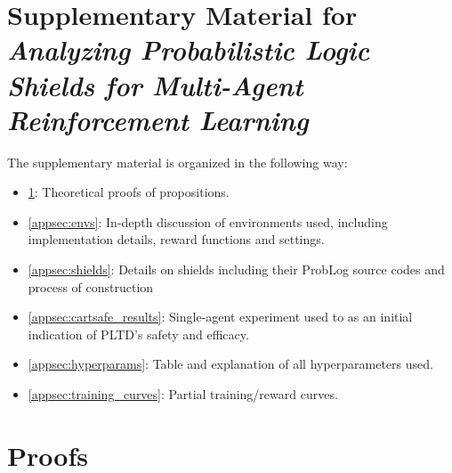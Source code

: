 \documentclass{ecai}
\theoremstyle{plain}
\theoremstyle{definition}
\theoremstyle{remark}
\begin{document}





\appendix


\section*{Supplementary Material for \textit{Analyzing Probabilistic Logic Shields for Multi-Agent Reinforcement Learning}}
The supplementary material is organized in the following way:
\begin{itemize} [Appendix]
    \item \ref{appsec:proofs}: Theoretical proofs of propositions.
    \item \ref{appsec:envs}: In-depth discussion of environments used, including implementation details, reward functions and settings. 
    \item \ref{appsec:shields}: Details on shields including their ProbLog source codes and process of construction
    \item \ref{appsec:cartsafe_results}: Single-agent experiment used to as an initial indication of PLTD's safety and efficacy.
    \item \ref{appsec:hyperparams}: Table and explanation of all hyperparameters used.
    \item \ref{appsec:training_curves}: Partial training/reward curves.
\end{itemize}
\section{Proofs}\label{appsec:proofs}
\end{document}
